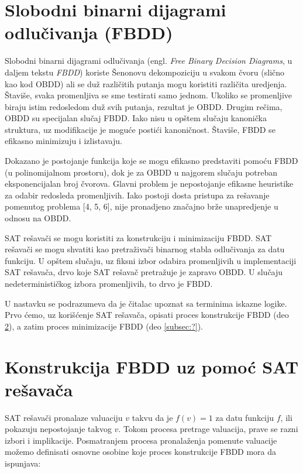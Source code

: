 \section{Slobodni binarni dijagrami odlu\v{c}ivanja (FBDD)}
\label{sec:FBDD}

Slobodni binarni dijagrami odlu\v{c}ivanja (engl. \emph{Free Binary Decision Diagrams}, u daljem tekstu \emph{FBDD}) koriste \v{S}enonovu dekompoziciju u svakom \v{c}voru (sli\v{c}no kao kod OBDD) ali se du\v{z} razli\v{c}itih putanja mogu koristiti razli\v{c}ita uredjenja. \v{S}tavi\v{s}e, svaka promenljiva se sme testirati samo jednom. Ukoliko se promenljive biraju istim redosledom du\v{z} svih putanja, rezultat je OBDD. Drugim re\v{c}ima, OBDD su specijalan slu\v{c}aj FBDD. Iako nisu u op\v{s}tem slu\v{c}aju kanoni\v{c}ka struktura, uz modifikacije je mogu\'c{}e posti\'c{}i kanoni\v{c}nost. \v{S}tavi\v{s}e, FBDD se efikasno minimizuju i izlistavaju.

Dokazano je  postojanje funkcija koje se mogu efikasno predstaviti pomo\'c{}u FBDD (u polinomijalnom prostoru), dok je za OBDD u najgorem slu\v{c}aju potreban eksponencijalan broj \v{c}vorova. Glavni problem je nepostojanje efikasne heuristike za odabir redosleda promenljivih. Iako postoji dosta pristupa za re\v{s}avanje pomenutog problema [4, 5, 6], nije pronadjeno zna\v{c}ajno br\v{z}e unapredjenje u odnosu na OBDD.

SAT re\v{s}ava\v{c}i se mogu koristiti za konstrukciju i minimizaciju FBDD. SAT re\v{s}ava\v{c}i se mogu shvatiti kao pretra\v{z}iva\v{c}i binarnog stabla odlu\v{c}ivanja za datu funkciju. U op\v{s}tem slu\v{c}aju, uz fiksni izbor odabira promenljivih u implementaciji SAT re\v{s}ava\v{c}a, drvo koje SAT re\v{s}ava\v{c} pretra\v{z}uje je zapravo OBDD. U slu\v{c}aju nedeterministi\v{c}kog izbora promenljivih, to drvo je FBDD.

U nastavku se podrazumeva da je \v{c}italac upoznat sa terminima iskazne logike. Prvo \'c{}emo, uz kori\v{s}\'c{}enje SAT re\v{s}ava\v{c}a, opisati proces konstrukcije FBDD (deo \ref{subsec:FBDDConstructionViaSAT}), a zatim proces minimizacije FBDD (deo \ref{subsec:?}).


\section{Konstrukcija FBDD uz pomo\'c{} SAT re\v{s}ava\v{c}a}
\label{subsec:FBDDConstructionViaSAT}

SAT re\v{s}ava\v{c}i pronalaze valuaciju $v$ takvu da je $f(v) = 1$ za datu funkciju $f$, ili pokazuju nepostojanje takvog $v$. Tokom procesa pretrage valuacija, prave se razni izbori i implikacije. Posmatranjem procesa pronala\v{z}enja pomenute valuacije mo\v{z}emo definisati osnovne osobine koje proces konstrukcije FBDD mora da ispunjava:

